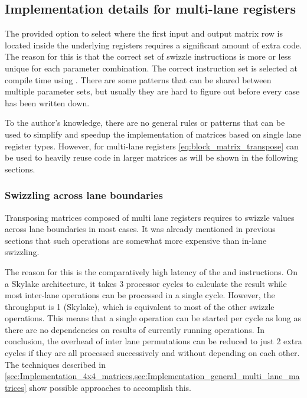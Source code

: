 \subsection{Implementation details for multi-lane registers}

The provided option to select where the first input and output matrix row is located inside the underlying registers requires a significant amount of extra code. 
The reason for this is that the correct set of swizzle instructions is more or less unique for each parameter combination.
The correct instruction set is selected at compile time using .
There are some patterns that can be shared between multiple parameter sets, but usually they are hard to figure out before every case has been written down.

To the author's knowledge, there are no general rules or patterns that can be used to simplify and speedup the implementation of matrices based on single lane register types.
However, for multi-lane registers \cref{eq:block_matrix_transpose} can be used to heavily reuse code in larger matrices as will be shown in the following sections.


\subsubsection{Swizzling across lane boundaries}

Transposing matrices composed of multi lane registers requires to swizzle values across lane boundaries in most cases.
It was already mentioned in previous sections that such operations are somewhat more expensive than in-lane swizzling.


The reason for this is the comparatively high latency of the  and  instructions.
On a Skylake architecture, it takes 3 processor cycles to calculate the result while most inter-lane operations can be processed in a single cycle.
However, the throughput is 1 (Skylake), which is equivalent to most of the other swizzle operations. 
This means that a single operation can be started per cycle as long as there are no dependencies on results of currently running operations.
In conclusion, the overhead of inter lane permutations can be reduced to just 2 extra cycles if they are all processed successively and without depending on each other.
The techniques described in \cref{sec:Implementation_4x4_matrices,sec:Implementation_general_multi_lane_matrices} show possible approaches to accomplish this.



